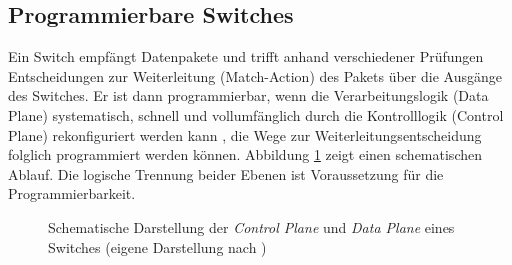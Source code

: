 \documentclass[utf8, biblatex]{lni}
\begin{document}
\subsection{Programmierbare Switches}
Ein Switch empfängt Datenpakete und trifft anhand verschiedener Prüfungen Entscheidungen zur Weiterleitung ({\glqq}Match-Action{\grqq}) des Pakets über die Ausgänge des Switches. Er ist dann programmierbar, wenn die Verarbeitungslogik ({\glqq}Data Plane{\grqq}) systematisch, schnell und vollumfänglich durch die Kontrolllogik ({\glqq}Control Plane{\grqq}) rekonfiguriert werden kann \cite[S. 2]{Bifulco18}, die Wege zur Weiterleitungsentscheidung folglich programmiert werden können. Abbildung \ref{SwitchPlanes} zeigt einen schematischen Ablauf. Die logische Trennung beider Ebenen ist Voraussetzung für die Programmierbarkeit.
\begin{figure}[h!]
\centering
{}
\caption{Schematische Darstellung der \textit{Control Plane} und \textit{Data Plane} eines Switches (eigene Darstellung nach \cite[S. 2]{Bifulco18})}
\label{SwitchPlanes}
\end{figure}
\pagebreak
\printbibliography
\end{document}
